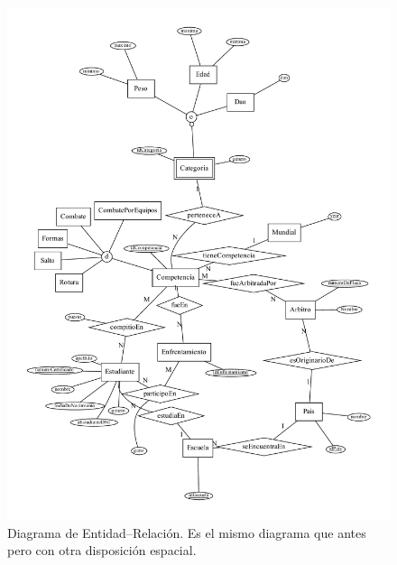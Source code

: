 \begin{figure}[H]
  \centering
  \includegraphics[width=\textwidth]{../mer/mer-neato.pdf}
  \caption{Diagrama de Entidad--Relación. Es el mismo diagrama que antes pero con otra disposición espacial.}
\end{figure}


